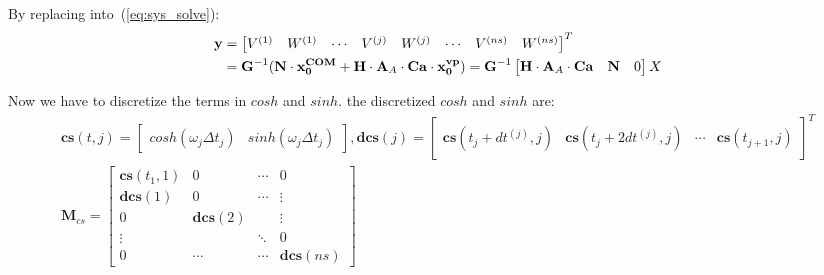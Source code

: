 \documentclass[journal]{IEEEtran}
\begin{document}
By replacing into~(\ref{eq:sys_solve}):
\begin{equation}
\begin{split}
\textbf{y} &=
\begin{bmatrix}
V^{(1)} & W^{(1)} & \cdots & V^{(j)} & W^{(j)} & \cdots & V^{(ns)} &  W^{(ns)}
\end{bmatrix}^{T} \\
&=\textbf{G}^{-1}(\mathbf{N}\cdot\mathbf{x^{\mbox{\tiny COM}}_0}+\mathbf{H}\cdot\mathbf{A}_A\cdot\mathbf{Ca}\cdot\mathbf{x^{vp}_0})=\textbf{G}^{-1}
\begin{bmatrix}
\mathbf{H}\cdot\mathbf{A}_A \cdot\mathbf{Ca} & \mathbf{N} & 0
\end{bmatrix}X
\end{split}
\end{equation}

Now we have to discretize the terms in $cosh$ and $sinh$. the discretized $cosh$ and $sinh$ are:
\begin{equation}
\label{eq:cs_discretized}
\begin{array}{l}
\textbf{cs}(t,j)=
\begin{bmatrix}
cosh(\omega_j \Delta t_j) & sinh(\omega_j \Delta t_j)
\end{bmatrix}, \textbf{dcs}(j)=
\begin{bmatrix}
\textbf{cs}(t_j+dt^{(j)},j) & \textbf{cs}(t_j+2dt^{(j)},j) & \cdots & \textbf{cs}(t_{j+1},j)
\end{bmatrix}^{T}\\
\textbf{M}_{cs}=
\begin{bmatrix}
\textbf{cs}(t_1,1) &  0 & \cdots & 0\\
\textbf{dcs}(1) & 0 & \cdots & \vdots\\
0 & \textbf{dcs}(2) & {} & \vdots\\
\vdots & {} & \ddots & 0 \\
0 & \cdots &  \cdots & \textbf{dcs}(ns) 
\end{bmatrix}
\end{array}
\end{equation}
\end{document}
